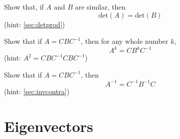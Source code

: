 \documentclass[Main.tex]{subfiles}
\begin{document}
\begin{EasyEx}
  Show that, if $A$ and $B$ are similar, then
  \[\mbox{det}(A)=\mbox{det}(B)\]
  (hint: \ref{sec:detprod})
\end{EasyEx}
\begin{Ex}
  Show that if $A=CBC^{-1}$, then for any whole number $k$,
  \[A^k = CB^kC^{-1}\]
  (hint: $A^2=CBC^{-1}CBC^{-1}$)
\end{Ex}
\begin{EasyEx}
  Show that if $A=CBC^{-1}$, then 
  \[A^{-1} = C^{-1}B^{-1}C\]
  (hint: \ref{sec:invcontra})
\end{EasyEx}

\exersisesr

\section{Eigenvectors}
\end{document}
